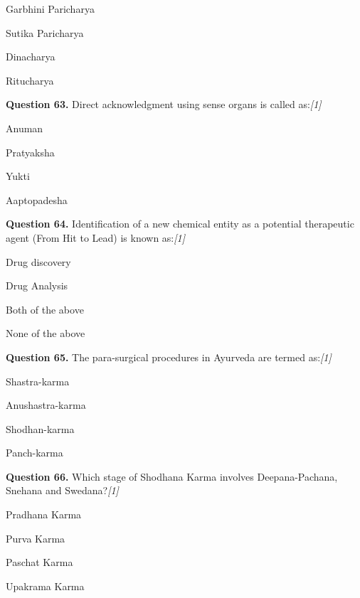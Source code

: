 \documentclass[11pt,a4paper]{article}
\newcommand{\pts}[1]{\hfill   \textit{[#1]}}
\begin{document}
\begin{parts}
  \item Garbhini Paricharya
  \item Sutika Paricharya
  \item Dinacharya
  \item Ritucharya
\end{parts}

\medskip


\noindent   \textbf{Question 63.} Direct acknowledgment using sense organs is called as:\pts{1}

\begin{parts}
  \item Anuman
  \item Pratyaksha
  \item Yukti
  \item Aaptopadesha
\end{parts}

\medskip


\noindent   \textbf{Question 64.} Identification of a new chemical entity as a potential therapeutic agent (From Hit to Lead) is known as:\pts{1}

\begin{parts}
  \item Drug discovery
  \item Drug Analysis
  \item Both of the above
  \item None of the above
\end{parts}

\medskip


\noindent   \textbf{Question 65.} The para-surgical procedures in Ayurveda are termed as:\pts{1}

\begin{parts}
  \item Shastra-karma
  \item Anushastra-karma
  \item Shodhan-karma
  \item Panch-karma
\end{parts}

\medskip


\noindent   \textbf{Question 66.} Which stage of Shodhana Karma involves Deepana-Pachana, Snehana and Swedana?\pts{1}

\begin{parts}
  \item Pradhana Karma
  \item Purva Karma
  \item Paschat Karma
  \item Upakrama Karma
\end{parts}
\end{document}
